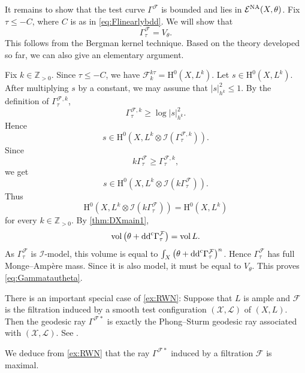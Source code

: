 \begin{example}
    It remains to show that the test curve $\Gamma^{\mathcal{F}}$ is bounded and lies in $\mathcal{E}^{\mathrm{NA}}(X,\theta)$. Fix $\tau\leq -C$, where $C$ is as in \eqref{eq:Flinearlybdd}. We will show that
    \begin{equation}\label{eq:Gammatautheta}
    \Gamma^{\mathcal{F}}_{\tau}=V_{\theta}.
    \end{equation}
    This follows from the Bergman kernel technique. Based on the theory developed so far, we can also give an elementary argument.

    Fix $k\in\mathbb Z_{>0}$. Since $\tau\leq -C$, we have $\mathcal F^{k\tau}_k=\mathrm H^0(X,L^k)$. Let $s\in\mathrm H^0(X,L^k)$. After multiplying $s$ by a constant, we may assume that $|s|_{h^k}^2\leq1$. By the definition of $\Gamma^{\mathcal F,k}_\tau$,
    \[
        \Gamma^{\mathcal F,k}_\tau\geq \log|s|_{h^k}^2.
    \]
    Hence
    \[
        s\in \mathrm H^0\left(X,L^k\otimes\mathcal I(\Gamma^{\mathcal F,k}_\tau)\right).
    \]
    Since
    \[
    k\Gamma^{\mathcal F}_\tau \geq \Gamma^{\mathcal F,k}_\tau,
    \]
    we get
    \[
        s\in \mathrm H^0\left(X,L^k\otimes\mathcal I(k\Gamma^{\mathcal F}_\tau)\right).
    \]
    Thus
    \[
        \mathrm H^0\left(X,L^k\otimes\mathcal I(k\Gamma^{\mathcal F}_\tau)\right)=\mathrm H^0(X,L^k)
    \]
    for every $k\in\mathbb Z_{>0}$. By \cref{thm:DXmain1},
    \[
        \operatorname{vol}\left(\theta+\mathrm{dd}^{\mathrm{c}}\Gamma^{\mathcal F}_\tau\right)=\operatorname{vol} L.
    \]
    As $\Gamma^{\mathcal F}_\tau$ is $\mathcal I$-model, this volume is equal to $\int_X\left(\theta+\mathrm{dd}^{\mathrm{c}} \Gamma^{\mathcal F}_\tau\right)^n$. Hence $\Gamma^{\mathcal F}_\tau$ has full Monge--Amp\`ere mass. Since it is also model, it must be equal to $V_\theta$. This proves \eqref{eq:Gammatautheta}.
\end{example}

\begin{remark}\label{rmk:PhongSturm}
    There is an important special case of \cref{ex:RWN}: Suppose that $L$ is ample and $\mathcal{F}$ is the filtration induced by a smooth test configuration $(\mathcal{X},\mathcal{L})$ of $(X,L)$. Then the geodesic ray $\Gamma^{\mathcal{F}*}$ is exactly the Phong--Sturm geodesic ray associated with $(\mathcal{X},\mathcal{L})$. See \cite[Section~9]{RWN14}.
\end{remark}

\begin{remark}\label{rmk:max_filt}
    We deduce from \cref{ex:RWN} that the ray $\Gamma^{\mathcal{F}*}$ induced by a filtration $\mathcal{F}$ is maximal.
\end{remark}

